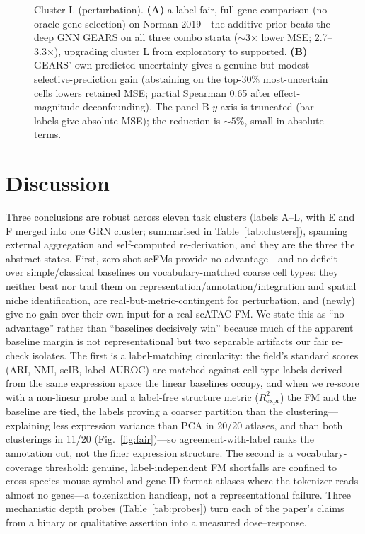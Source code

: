 \documentclass[11pt]{article}
\begin{document}
\begin{figure}[htb]\centering
\caption{Cluster L (perturbation). \textbf{(A)} a label-fair, full-gene comparison (no oracle gene selection) on Norman-2019---the additive prior beats the deep GNN GEARS on all three combo strata ($\sim$3$\times$ lower MSE; 2.7--3.3$\times$), upgrading cluster L from exploratory to supported. \textbf{(B)} GEARS' own predicted uncertainty gives a genuine but modest selective-prediction gain (abstaining on the top-30\% most-uncertain cells lowers retained MSE; partial Spearman 0.65 after effect-magnitude deconfounding). The panel-B $y$-axis is truncated (bar labels give absolute MSE); the reduction is ${\sim}5\%$, small in absolute terms.}\label{fig:perturb}\end{figure}



\section{Discussion}

Three conclusions are robust across eleven task clusters (labels A--L, with E and F merged into one GRN cluster; summarised in Table~\ref{tab:clusters}), spanning external aggregation and self-computed re-derivation, and they are the three the abstract states. First, zero-shot scFMs provide no advantage---and no deficit---over simple/classical baselines on vocabulary-matched coarse cell types: they neither beat nor trail them on representation/annotation/integration and spatial niche identification, are real-but-metric-contingent for perturbation, and (newly) give no gain over their own input for a real scATAC FM. We state this as ``no advantage'' rather than ``baselines decisively win'' because much of the apparent baseline margin is not representational but two separable artifacts our fair re-check isolates. The first is a label-matching circularity: the field's standard scores (ARI, NMI, scIB, label-AUROC) are matched against cell-type labels derived from the same expression space the linear baselines occupy, and when we re-score with a non-linear probe and a label-free structure metric ($R^2_{\mathrm{expr}}$) the FM and the baseline are tied, the labels proving a coarser partition than the clustering---explaining less expression variance than PCA in 20/20 atlases, and than both clusterings in 11/20 (Fig.~\ref{fig:fair})---so agreement-with-label ranks the annotation cut, not the finer expression structure. The second is a vocabulary-coverage threshold: genuine, label-independent FM shortfalls are confined to cross-species mouse-symbol and gene-ID-format atlases where the tokenizer reads almost no genes---a tokenization handicap, not a representational failure. Three mechanistic depth probes (Table~\ref{tab:probes}) turn each of the paper's claims from a binary or qualitative assertion into a measured dose--response.
\end{document}
